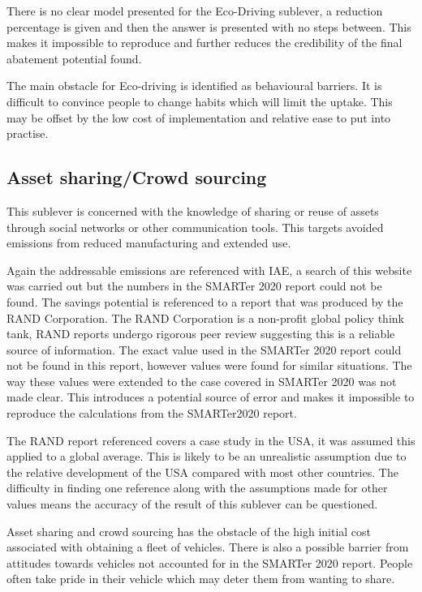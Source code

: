 There is no clear model presented for the Eco-Driving sublever, a reduction percentage is given and then the answer is presented with no steps between. This makes it impossible to reproduce and further reduces the credibility of the final abatement potential found. 

The main obstacle for Eco-driving is identified as behavioural barriers. It is difficult to convince people to change habits which will limit the uptake. This may be offset by the low cost of implementation and relative ease to put into practise. 


\subsection{Asset sharing/Crowd sourcing}

This sublever is concerned with the knowledge of sharing or reuse of assets through social networks or other communication tools. This targets avoided emissions from reduced manufacturing and extended use. 

 Again the addressable emissions are referenced with IAE, a search of this website was carried out but the numbers in the SMARTer 2020 report could not be found. The savings potential is referenced to a report that was produced by the RAND Corporation. The RAND Corporation is a non-profit global policy think tank, RAND reports undergo rigorous peer review suggesting this is a reliable source of information. The exact value used in the SMARTer 2020 report could not be found in this report, however values were found for similar situations. The way these values were extended to the case covered in SMARTer 2020 was not made clear. This introduces a potential source of error and makes it impossible to reproduce the calculations from the SMARTer2020 report.
 
The RAND report referenced covers a case study in the USA, it was assumed this applied to a global average. This is likely to be an unrealistic assumption due to the relative development of the USA compared with most other countries. The difficulty in finding one reference along with the assumptions made for other values means the accuracy of the result of this sublever can be questioned. 

Asset sharing and crowd sourcing has the obstacle of the high initial cost associated with obtaining a fleet of vehicles. There is also a possible barrier from attitudes towards vehicles not accounted for in the SMARTer 2020 report. People often take pride in their vehicle which may deter them from wanting to share. 

